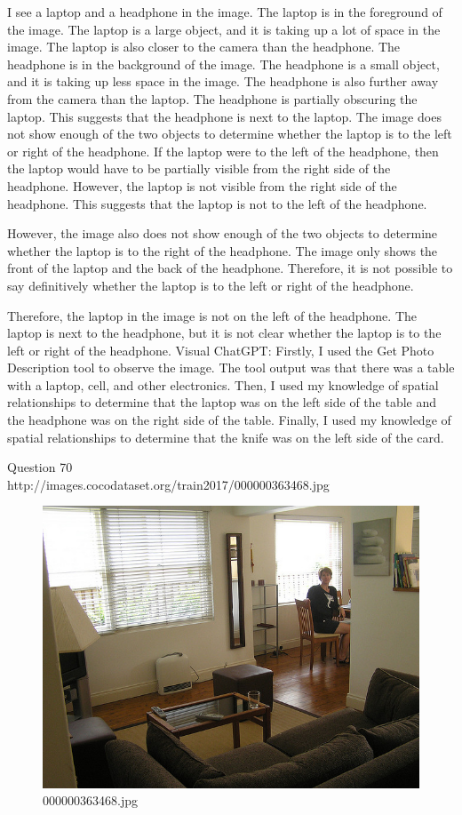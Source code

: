 \begin{enumerate}
    I see a laptop and a headphone in the image.
    The laptop is in the foreground of the image. The laptop is a large object, and it is taking up a lot of space in the image. The laptop is also closer to the camera than the headphone.
    The headphone is in the background of the image. The headphone is a small object, and it is taking up less space in the image. The headphone is also further away from the camera than the laptop.
    The headphone is partially obscuring the laptop. This suggests that the headphone is next to the laptop.
    The image does not show enough of the two objects to determine whether the laptop is to the left or right of the headphone.
    If the laptop were to the left of the headphone, then the laptop would have to be partially visible from the right side of the headphone. However, the laptop is not visible from the right side of the headphone. This suggests that the laptop is not to the left of the headphone.
    
    However, the image also does not show enough of the two objects to determine whether the laptop is to the right of the headphone. The image only shows the front of the laptop and the back of the headphone. Therefore, it is not possible to say definitively whether the laptop is to the left or right of the headphone.
    
    Therefore, the laptop in the image is not on the left of the headphone. The laptop is next to the headphone, but it is not clear whether the laptop is to the left or right of the headphone.
    \subitem Visual ChatGPT: Firstly, I used the Get Photo Description tool to observe the image. The tool output was that there was a table with a laptop, cell, and other electronics. Then, I used my knowledge of spatial relationships to determine that the laptop was on the left side of the table and the headphone was on the right side of the table. Finally, I used my knowledge of spatial relationships to determine that the knife was on the left side of the card.
\end{enumerate}
Question 70\\
http://images.cocodataset.org/train2017/000000363468.jpg
\begin{figure}[h]
    \centering
    \includegraphics[width=0.8\linewidth]{../image set/hard/000000363468.jpg}
    \caption{000000363468.jpg}
\end{figure}
